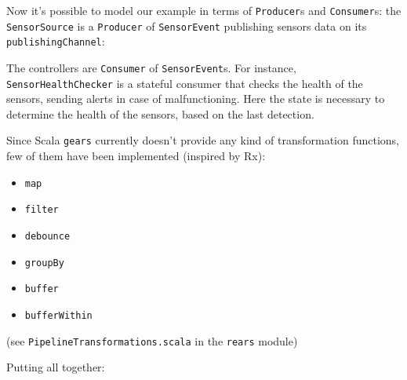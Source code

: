 \documentclass[aspectratio=1610,xcolor=dvipsnames,handout]{beamer}
\begin{document}
%
\begin{frame}
  
\end{frame}
%
\begin{frame}
  \small
  Now it's possible to model our example in terms of \texttt{Producer}s and \texttt{Consumer}s: the \texttt{SensorSource} is a \texttt{Producer} of \texttt{SensorEvent} publishing sensors data on its \texttt{publishingChannel}:
  
\end{frame}
%
\begin{frame}
  \small
  The controllers are \texttt{Consumer} of \texttt{SensorEvent}s. For instance, 
  \texttt{SensorHealthChecker} is a stateful consumer that checks the health of the sensors, sending alerts in case of malfunctioning. Here the state is necessary to determine the health of the sensors, based on the last detection.
  
\end{frame}
%
\begin{frame}
  
\end{frame}
%
\begin{frame}
  Since Scala \texttt{gears} currently doesn't provide any kind of transformation functions, few of them have been implemented (inspired by Rx):
  \begin{itemize}
      \item \texttt{map}
      \item \texttt{filter}
      \item \texttt{debounce}
      \item \texttt{groupBy}
      \item \texttt{buffer}
      \item \texttt{bufferWithin}
  \end{itemize}
  \footnotesize
  (see \texttt{PipelineTransformations.scala} in the \texttt{rears} module)
\end{frame}
%
\begin{frame}
  \small
  Putting all together:
  
\end{frame}
%
\end{document}

